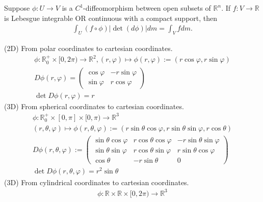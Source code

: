 \begin{theorem}
    Suppose \(\phi: U \rightarrow V\) is a \(C^1\)-diffeomorphism between open subsets of \(\mathbb{R}^n\). If \(f: V \rightarrow \mathbb{R}\) is Lebesgue integrable OR continuous with a compact support, then
    \begin{align}
        \int_U (f \circ \phi) |\det(d\phi)| dm = \int_V f dm \text{.}
    \end{align}
    \end{theorem}
    \begin{example}
        (2D) From polar coordinates to cartesian coordinates.
        \begin{gather}
            \phi: \mathbb{R}_0^+ \times [0, 2\pi) \rightarrow \mathbb{R}^2, (r, \varphi) \mapsto \phi(r, \varphi) := (r \cos \varphi, r \sin \varphi) \\
            D \phi (r, \varphi) =         \begin{pmatrix}
                \cos \varphi & -r \sin \varphi \\
                \sin \varphi & r \cos \varphi
            \end{pmatrix}\\
            \det D\phi(r, \varphi) = r
        \end{gather}
        (3D) From spherical coordinates to cartesian coordinates.
        \begin{gather}
            \phi: \mathbb{R}_0^+ \times [0, \pi] \times [0, \pi) \rightarrow \mathbb{R}^3\\
            (r, \theta, \varphi) \mapsto \phi(r, \theta, \varphi) := (r \sin \theta \cos \varphi, r \sin \theta \sin \varphi, r \cos \theta)\\
            D\phi(r, \theta, \varphi) := \begin{pmatrix}
                \sin \theta \cos \varphi & r \cos \theta \cos \varphi & -r \sin \theta \sin \varphi \\
                \sin \theta \sin \varphi & r \cos \theta \sin \varphi & r \sin \theta \cos \varphi \\
                \cos \theta & -r \sin \theta & 0
            \end{pmatrix}\\
            \det D\phi(r, \theta, \varphi) = r^2 \sin \theta
        \end{gather}
        (3D) From cylindrical coordinates to cartesian coordinates.
        \begin{gather}
            \phi: \mathbb{R} \times \mathbb{R} \times [0, 2\pi) \rightarrow \mathbb{R}^3\\

\end{gather}
\end{example}
